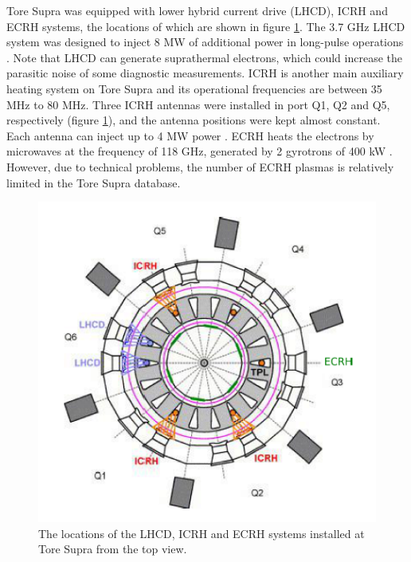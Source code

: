 Tore Supra was equipped with lower hybrid current drive (LHCD), ICRH and ECRH systems, the locations of which are shown in figure \ref{fig:ts_heating}. The 3.7 GHz LHCD system was designed to inject 8 MW of additional power in long-pulse operations \cite{Bibet_2001_FED}. Note that LHCD can generate suprathermal electrons, which could increase the parasitic noise of some diagnostic measurements. ICRH is another main auxiliary heating system on Tore Supra and its operational frequencies are between 35 MHz to 80 MHz. Three ICRH antennas were installed in port Q1, Q2 and Q5, respectively (figure \ref{fig:ts_heating}), and the antenna positions were kept almost constant. Each antenna can inject up to 4 MW power \cite{Colas_2006_NF_ICRH}. ECRH heats the electrons by microwaves at the frequency of 118 GHz, generated by 2 gyrotrons of 400 kW \cite{Lennholm_2003_NF_ECRH}. However, due to technical problems, the number of ECRH plasmas is relatively limited in the Tore Supra database.


\begin{figure}[h]
\begin{centering}
\includegraphics[scale=0.7]{ts_heating.png}
\par\end{centering}
\caption{The locations of the LHCD, ICRH and ECRH systems installed at Tore Supra from the top view.}
\label{fig:ts_heating}
\end{figure}

